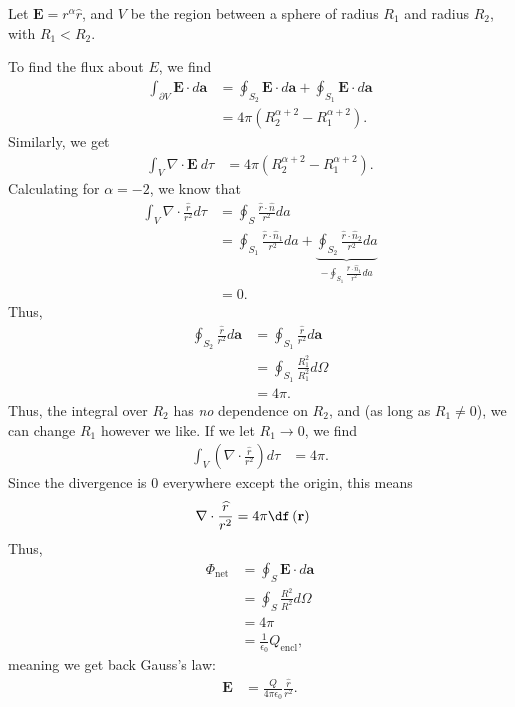 \documentclass[10pt]{mypackage}
\begin{document}
\begin{example}
  Let $\mathbf{E} = r^{\alpha}\widehat{r}$, and $V$ be the region between a sphere of radius $R_1$ and radius $R_2$, with $R_1 < R_2$.\newline

  To find the flux about $E$, we find
  \begin{align*}
    \int_{\partial V}^{} \mathbf{E}\cdot d\mathbf{a} &= \oint_{S_2}\mathbf{E}\cdot d\mathbf{a} + \oint_{S_1} \mathbf{E}\cdot d\mathbf{a}\\
                                            &= 4\pi \left(R_2^{\alpha + 2} - R_{1}^{\alpha + 2}\right).
  \end{align*}
  Similarly, we get
  \begin{align*}
    \int_{V}^{} \nabla \cdot \mathbf{E}\:d\tau &= 4\pi\left(R_2^{\alpha + 2} - R_1^{\alpha + 2}\right).
  \end{align*}
  Calculating for $\alpha = -2$, we know that
  \begin{align*}
    \int_{V}\nabla \cdot \frac{\widehat{r}}{r^2}d\tau &= \oint_{S}\frac{\widehat{r}\cdot \widehat{n}}{r^2}da\\
                                                  &= \oint_{S_1}\frac{\widehat{r}\cdot \widehat{n}_1}{r^2}da + \underbrace{\oint_{S_2}\frac{\widehat{r}\cdot \widehat{n}_2}{r^2}da}_{-\oint_{S_1}\frac{\widehat{r}\cdot \widehat{n}_1}{r^2}da}\\
                                                  &= 0.
  \end{align*}
  Thus,
  \begin{align*}
    \oint_{S_2}\frac{\widehat{r}}{r^2}d\mathbf{a} &= \oint_{S_1}\frac{\widehat{r}}{r^2}d\mathbf{a}\\
                                              &= \oint_{S_1}\frac{R_1^{2}}{R_1^2}d\Omega\\
                                              &= 4\pi.
  \end{align*}
  Thus, the integral over $R_2$ has \textit{no} dependence on $R_2$, and (as long as $R_1\neq 0$), we can change $R_1$ however we like. If we let $R_1\rightarrow 0$, we find
  \begin{align*}
    \int_{V}\left(\nabla \cdot \frac{\widehat{r}}{r^2}\right)d\tau &= 4\pi.
  \end{align*}
  Since the divergence is $0$ everywhere except the origin, this means
  \begin{align*}
    \nabla \cdot \frac{\widehat{r}}{r^2} &= 4\pi \df\left(\mathbf{r}\right)
  \end{align*}
  Thus,
  \begin{align*}
    \Phi_{\text{net}} &= \oint_{S}\mathbf{E}\cdot d\mathbf{a}\\
                      &= \oint_{S}\frac{R^2}{R^2}d\Omega\\
                      &= 4\pi\\
                      &= \frac{1}{\epsilon_0}Q_{\text{encl}},
  \end{align*}
  meaning we get back Gauss's law:
  \begin{align*}
    \mathbf{E} &= \frac{Q}{4\pi\epsilon_0}\frac{\widehat{r}}{r^2}.
  \end{align*}
\end{example}
\end{document}

